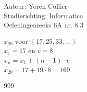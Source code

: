 \documentclass[a4paper]{article}
\newcommand{\Lh}{\left(} %
\newcommand{\Rh}{\right)}
\begin{document}
\noindent \large Auteur: Yoren Collier \\
\noindent \large Studierichting: Informatica\\
\noindent \large Oefeningenreeks 6A nr. 8.3\\

\medskip

\normalsize

$x_{20}$ voor $\Lh 17, 25, 33, ... \Rh$\\

$x_1 = 17$ en $v = 8$\\

$x_n = x_1 + \Lh n-1 \Rh \cdot v$\\

$x_{20} = 17 + 19 \cdot 8 = 169$\\

\begin{thebibliography}{999}
\end{thebibliography}
\end{document}

